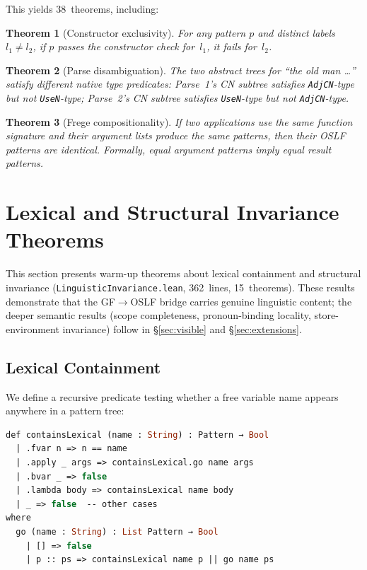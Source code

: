 \documentclass[11pt]{article}
\newtheorem{theorem}{Theorem}
\newcommand{\code}[1]{\texttt{#1}}
\newcommand{\OSLF}{\textup{OSLF}}
\newcommand{\GF}{\textup{GF}}
\begin{document}
This yields 38~theorems, including:

\begin{theorem}[Constructor exclusivity]
For any pattern $p$ and distinct labels $l_1 \neq l_2$, if $p$ passes the
constructor check for~$l_1$, it fails for~$l_2$.
\end{theorem}

\begin{theorem}[Parse disambiguation]
The two abstract trees for ``the old man \ldots'' satisfy different native
type predicates: Parse~1's CN subtree satisfies \code{AdjCN}-type but not
\code{UseN}-type; Parse~2's CN subtree satisfies \code{UseN}-type but not
\code{AdjCN}-type.
\end{theorem}

\begin{theorem}[Frege compositionality]
If two applications use the same function signature and their argument lists
produce the same patterns, then their \OSLF{} patterns are identical.
Formally, equal argument patterns imply equal result patterns.
\end{theorem}

\section{Lexical and Structural Invariance Theorems}
\label{sec:invariance}

This section presents warm-up theorems about lexical containment and
structural invariance (\code{LinguisticInvariance.lean},
362~lines, 15~theorems).  These results demonstrate that the
\GF{}$\to$\OSLF{} bridge carries genuine linguistic content; the deeper
semantic results (scope completeness, pronoun-binding locality,
store-environment invariance) follow in \S\ref{sec:visible} and
\S\ref{sec:extensions}.

\subsection{Lexical Containment}

We define a recursive predicate testing whether a free variable name
appears anywhere in a pattern tree:

\begin{lstlisting}[language=ml,caption={Recursive lexical containment}]
def containsLexical (name : String) : Pattern → Bool
  | .fvar n => n == name
  | .apply _ args => containsLexical.go name args
  | .bvar _ => false
  | .lambda body => containsLexical name body
  | _ => false  -- other cases
where
  go (name : String) : List Pattern → Bool
    | [] => false
    | p :: ps => containsLexical name p || go name ps
\end{lstlisting}
\end{document}
